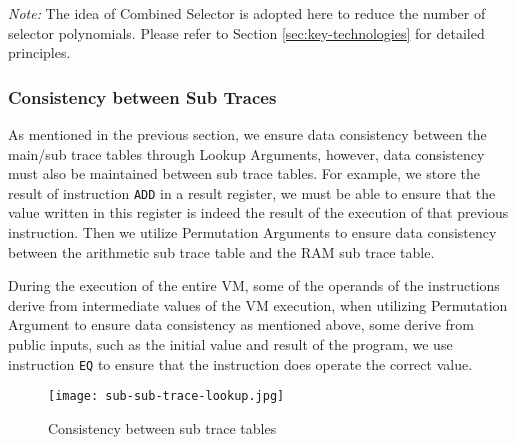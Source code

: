 \emph{Note:} The idea of Combined Selector is adopted here to reduce the number of selector polynomials. Please refer to Section \ref{sec:key-technologies} for detailed principles.

\subsubsection{Consistency between Sub Traces}

As mentioned in the previous section, we ensure data consistency between the main/sub trace tables through Lookup Arguments, however, data consistency must also be maintained between sub trace tables. For example, we store the result of instruction \verb|ADD| in a result register, we must be able to ensure that the value written in this register is indeed the result of the execution of that previous instruction. Then we utilize Permutation Arguments to ensure data consistency between the arithmetic sub trace table and the RAM sub trace table.

During the execution of the entire VM, some of the operands of the instructions derive from intermediate values of the VM execution, when utilizing Permutation Argument to ensure data consistency as mentioned above, some derive from public inputs, such as the initial value and result of the program, we use instruction \verb|EQ| to ensure that the instruction does operate the correct value.
\begin{figure}[!ht]
    \centering
    \texttt{[image: sub-sub-trace-lookup.jpg]}
    \caption{Consistency between sub trace tables}
    \label{fig:sub-sub-trace-lookup}
\end{figure}
